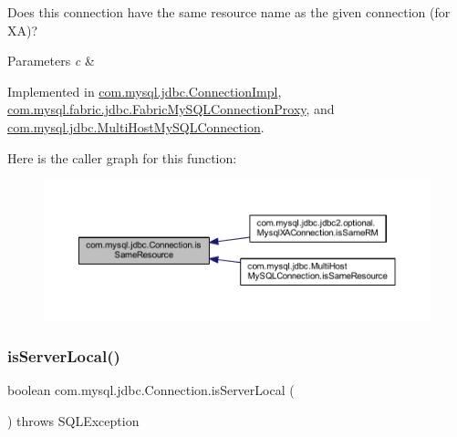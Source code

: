 Does this connection have the same resource name as the given connection (for XA)?


\begin{DoxyParams}{Parameters}
{\em c} & \\
\hline
\end{DoxyParams}


Implemented in \mbox{\hyperlink{classcom_1_1mysql_1_1jdbc_1_1_connection_impl_a18299d4f2cf6b1092dfb30b5fbd33a5c}{com.\+mysql.\+jdbc.\+Connection\+Impl}}, \mbox{\hyperlink{classcom_1_1mysql_1_1fabric_1_1jdbc_1_1_fabric_my_s_q_l_connection_proxy_ae661cd405492617e9cea0fec851dbac1}{com.\+mysql.\+fabric.\+jdbc.\+Fabric\+My\+S\+Q\+L\+Connection\+Proxy}}, and \mbox{\hyperlink{classcom_1_1mysql_1_1jdbc_1_1_multi_host_my_s_q_l_connection_a476b5999b12b909b4b43cd3c97b4f5d5}{com.\+mysql.\+jdbc.\+Multi\+Host\+My\+S\+Q\+L\+Connection}}.

Here is the caller graph for this function\+:\nopagebreak
\begin{figure}[H]
\begin{center}
\leavevmode
\includegraphics[width=350pt]{interfacecom_1_1mysql_1_1jdbc_1_1_connection_a3663c7e933a14a8cc26e16d0f78956a6_icgraph}
\end{center}
\end{figure}
\mbox{\label{interfacecom_1_1mysql_1_1jdbc_1_1_connection_a37eb25137505b9aaf4b25a847f87e949}} 
\subsubsection{\texorpdfstring{is\+Server\+Local()}{isServerLocal()}}
{\footnotesize\ttfamily boolean com.\+mysql.\+jdbc.\+Connection.\+is\+Server\+Local (\begin{DoxyParamCaption}{ }\end{DoxyParamCaption}) throws S\+Q\+L\+Exception}

